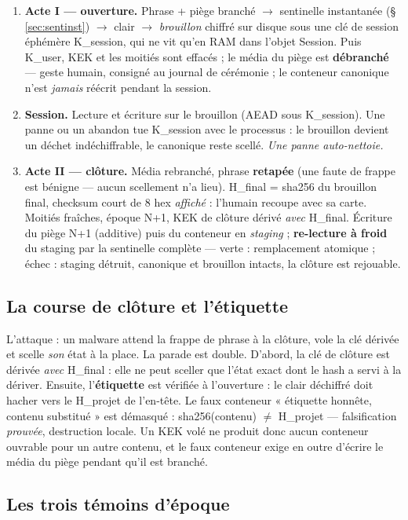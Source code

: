 \begin{enumerate}
\item \textbf{Acte I — ouverture.} Phrase + piège branché $\to$ sentinelle
instantanée (§ \ref{sec:sentinst}) $\to$ clair $\to$ \emph{brouillon} chiffré sur
disque sous une clé de session éphémère K\_session, qui ne vit qu'en RAM dans l'objet
Session. Puis K\_user, KEK et les moitiés sont effacés ; le média du piège est
\textbf{débranché} — geste humain, consigné au journal de cérémonie ; le conteneur
canonique n'est \emph{jamais} réécrit pendant la session.
\item \textbf{Session.} Lecture et écriture sur le brouillon (AEAD sous K\_session).
Une panne ou un abandon tue K\_session avec le processus : le brouillon devient un
déchet indéchiffrable, le canonique reste scellé. \emph{Une panne auto-nettoie.}
\item \textbf{Acte II — clôture.} Média rebranché, phrase \textbf{retapée} (une faute
de frappe est bénigne — aucun scellement n'a lieu). H\_final = sha256 du brouillon
final, checksum court de 8 hex \emph{affiché} : l'humain recoupe avec sa carte. Moitiés
fraîches, époque N+1, KEK de clôture dérivé \emph{avec} H\_final. Écriture du piège
N+1 (additive) puis du conteneur en \emph{staging} ; \textbf{re-lecture à froid} du
staging par la sentinelle complète — verte : remplacement atomique ; échec : staging
détruit, canonique et brouillon intacts, la clôture est rejouable.
\end{enumerate}

\subsection{La course de clôture et l'étiquette}\label{sec:course}

L'attaque : un malware attend la frappe de phrase à la clôture, vole la clé dérivée et
scelle \emph{son} état à la place. La parade est double. D'abord, la clé de clôture
est dérivée \emph{avec} H\_final : elle ne peut sceller que l'état exact dont le hash a
servi à la dériver. Ensuite, l'\textbf{étiquette} est vérifiée à l'ouverture : le clair
déchiffré doit hacher vers le H\_projet de l'en-tête. Le faux conteneur « étiquette
honnête, contenu substitué » est démasqué : sha256(contenu) $\neq$ H\_projet —
falsification \emph{prouvée}, destruction locale. Un KEK volé ne produit donc aucun
conteneur ouvrable pour un autre contenu, et le faux conteneur exige en outre d'écrire
le média du piège pendant qu'il est branché.

\subsection{Les trois témoins d'époque}\label{sec:temoins}


